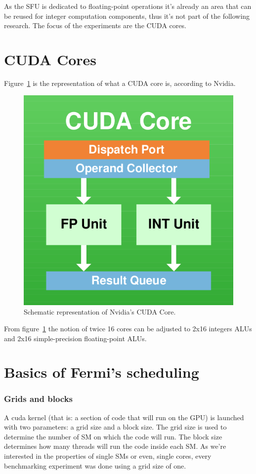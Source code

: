 \documentclass{report}
\begin{document}
    As the SFU is dedicated to floating-point operations it's already an area
    that can be reused for integer computation components, thus it's not part
    of the following research. The focus of the experiments are the CUDA cores.

    \section{CUDA Cores}
    Figure~\ref{fig:CUDACore} is the representation of what a CUDA core is,
    according to Nvidia.
    
    \begin{figure}[H]
    \centering
        \includegraphics[width=0.5\linewidth]{pictures/CUDACore}
        \captionsetup{justification=centering}
        \caption{Schematic representation of Nvidia's CUDA Core.}
        \label{fig:CUDACore}
    \end{figure}
    
    From figure~\ref{fig:CUDACore} the notion of twice 16 cores can be
    adjusted to 2x16 integers ALUs and 2x16 simple-precision floating-point
    ALUs.

    \section{Basics of Fermi's scheduling}
        \subsubsection{Grids and blocks} 
        A cuda kernel (that is: a section of code that will run on the GPU) is
        launched with two parameters: a grid size and a block size. The grid 
        size is used to determine the number of SM on which the code will run.
        The block size determines how many threads will run the code inside each
        SM. As we're interested in the properties of single SMs or even, single
        cores, every benchmarking experiment was done using a grid size of one.
\end{document}
